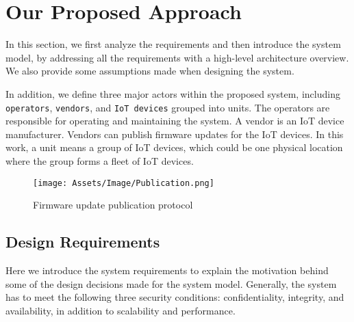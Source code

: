 \documentclass[conference]{IEEEtran}
\begin{document}
\section{Our Proposed Approach} \label{sec:3}

In this section, we first analyze the requirements and then introduce the system model, by addressing all the requirements with a high-level architecture overview. We also provide some assumptions made when designing the system.

In addition, we define three major actors within the proposed  system, including \texttt{operators}, \texttt{vendors}, and \texttt{IoT devices} grouped into units. The operators are responsible for operating and maintaining the system. A vendor is an IoT device manufacturer. Vendors can publish firmware updates for the IoT devices. In this work, a unit means a group of IoT devices, which could be one physical location where the group forms a fleet of IoT devices.

\begin{figure*}[t]
\centering
\texttt{[image: Assets/Image/Publication.png]}
\caption{Firmware update publication protocol}
\label{fig:Publication}
\vspace{-2mm}
\end{figure*}


\subsection{Design Requirements}

Here we introduce the system requirements to explain the motivation behind some of the design decisions made for the system model. Generally, the system has to meet the following three security conditions: confidentiality, integrity, and availability, in addition to scalability and performance.
\end{document}
